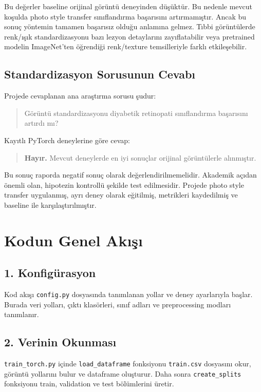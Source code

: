 \documentclass[12pt,a4paper]{article}
\begin{document}
Bu değerler baseline orijinal görüntü deneyinden düşüktür. Bu nedenle mevcut koşulda photo style transfer sınıflandırma başarısını artırmamıştır. Ancak bu sonuç yöntemin tamamen başarısız olduğu anlamına gelmez. Tıbbi görüntülerde renk/ışık standardizasyonu bazı lezyon detaylarını zayıflatabilir veya pretrained modelin ImageNet'ten öğrendiği renk/texture temsilleriyle farklı etkileşebilir.

\subsection{Standardizasyon Sorusunun Cevabı}

Projede cevaplanan ana araştırma sorusu şudur:

\begin{quote}
    Görüntü standardizasyonu diyabetik retinopati sınıflandırma başarısını artırdı mı?
\end{quote}

Kayıtlı PyTorch deneylerine göre cevap:

\begin{quote}
    \textbf{Hayır.} Mevcut deneylerde en iyi sonuçlar orijinal görüntülerle alınmıştır.
\end{quote}

Bu sonuç raporda negatif sonuç olarak değerlendirilmemelidir. Akademik açıdan önemli olan, hipotezin kontrollü şekilde test edilmesidir. Projede photo style transfer uygulanmış, ayrı deney olarak eğitilmiş, metrikleri kaydedilmiş ve baseline ile karşılaştırılmıştır.

\section{Kodun Genel Akışı}

\subsection{1. Konfigürasyon}

Kod akışı \texttt{config.py} dosyasında tanımlanan yollar ve deney ayarlarıyla başlar. Burada veri yolları, çıktı klasörleri, sınıf adları ve preprocessing modları tanımlanır.

\subsection{2. Verinin Okunması}

\texttt{train\_torch.py} içinde \texttt{load\_dataframe} fonksiyonu \texttt{train.csv} dosyasını okur, görüntü yollarını bulur ve dataframe oluşturur. Daha sonra \texttt{create\_splits} fonksiyonu train, validation ve test bölümlerini üretir.
\end{document}
